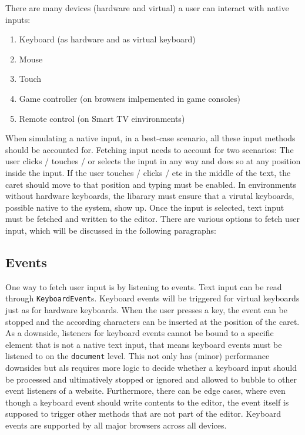 There are many devices (hardware and virtual) a user can interact with native inputs:

\begin{enumerate} 
\item Keyboard (as hardware and as virtual keyboard)
\item Mouse
\item Touch
\item Game controller (on browsers imlpemented in game consoles)
\item Remote control (on Smart TV einvironments)
\end{enumerate}

When simulating a native input, in a best-case scenario, all these input methods should be accounted for. Fetching input needs to account for two scenarios: The user clicks / touches / or selects the input in any way and does so at any position inside the input. If the user touches / clicks / etc in the middle of the text, the caret should move to that position and typing must be enabled. In environments without hardware keyboards, the libarary must ensure that a virutal keyboards, possible native to the system, show up. Once the input is selected, text input must be fetched and written to the editor. There are various options to fetch user input, which will be discussed in the following paragraphs:

\subsection{Events} One way to fetch user input is by listening to events. Text input can be read through \texttt{KeyboardEvent}s. Keyboard events will be triggered for virtual keyboards just as for hardware keyboards. When the user presses a key, the event can be stopped and the according characters can be inserted at the position of the caret. As a downside, listeners for keyboard events cannot be bound to a specific element that is not a native text input, that means keyboard events must be listened to on the \texttt{document} level. This not only has (minor) performance downsides but als requires more logic to decide whether a keyboard input should be processed and ultimatively stopped or ignored and allowed to bubble to other event listeners of a website. Furthermore, there can be edge cases, where even though a keyboard event should write contents to the editor, the event itself is supposed to trigger other methods that are not part of the editor. Keyboard events are supported by all major browsers across all devices.

